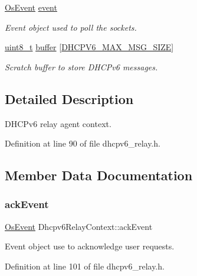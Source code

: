 \begin{DoxyCompactItemize}
\hyperlink{structOsEvent}{Os\+Event} \hyperlink{structDhcpv6RelayContext_a0db53b8fcf50ef4cb5067a6af954c659}{event}
\begin{DoxyCompactList}\small\item\em Event object used to poll the sockets. \end{DoxyCompactList}\item 
\hyperlink{stdint_8h_aba7bc1797add20fe3efdf37ced1182c5}{uint8\+\_\+t} \hyperlink{structDhcpv6RelayContext_a3ca219cd9bd76e4b98038814a5c3c653}{buffer} \mbox{[}\hyperlink{dhcpv6__common_8h_a4b2fa99ee47d1cc91da2b57fa69b324f}{D\+H\+C\+P\+V6\+\_\+\+M\+A\+X\+\_\+\+M\+S\+G\+\_\+\+S\+I\+ZE}\mbox{]}
\begin{DoxyCompactList}\small\item\em Scratch buffer to store D\+H\+C\+Pv6 messages. \end{DoxyCompactList}\end{DoxyCompactItemize}


\subsection{Detailed Description}
D\+H\+C\+Pv6 relay agent context. 

Definition at line 90 of file dhcpv6\+\_\+relay.\+h.



\subsection{Member Data Documentation}
\mbox{\label{structDhcpv6RelayContext_af3a40357f3522b48095aee5287ce085e}} 
\subsubsection{\texorpdfstring{ack\+Event}{ackEvent}}
{\footnotesize\ttfamily \hyperlink{structOsEvent}{Os\+Event} Dhcpv6\+Relay\+Context\+::ack\+Event}



Event object use to acknowledge user requests. 



Definition at line 101 of file dhcpv6\+\_\+relay.\+h.

\mbox{\label{structDhcpv6RelayContext_a3ca219cd9bd76e4b98038814a5c3c653}} 
